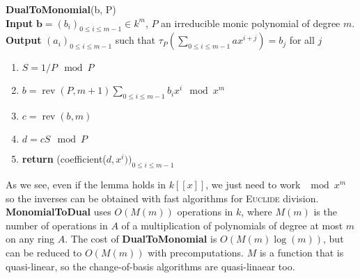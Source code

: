 \documentclass[a4paper,11pt]{article}
\theoremstyle{break}
\theoremstyle{definition}
\theoremstyle{remark}
\DeclareMathOperator{\rev}{rev}
\begin{document}
\textbf{DualToMonomial}(b, P)\\
\textbf{Input} $\textbf{b}=(b_i)_{0\leq i\leq m-1}\in k^m$, $P$ an irreducible
monic polynomial of degree $m$.\\
\textbf{Output} $(a_i)_{0\leq i \leq m-1}$ such that
$\tau_P(\sum_{0\leq i \leq m-1}ax^{i+j})=b_j$ for all $j$
\begin{enumerate}
  \item $S=1/P \mod P$
  \item $b=\rev(P,m+1)\sum_{0\leq i\leq m-1}b_ix^i\mod x^m$
  \item $c=\rev(b,m)$
  \item $d=cS \mod P$
  \item \textbf{return} (coefficient($d,x^i))_{0\leq i \leq m-1}$
\end{enumerate}

As we see, even if the lemma holds in $k[[x]]$, we just need to work $\mod x^m$
so the inverses can be obtained with fast algorithms for \textsc{Euclide}
division. \textbf{MonomialToDual} uses $O(M(m))$ operations in $k$, where 
$M(m)$ is the number of operations in $A$ of a multiplication of polynomials of 
degree at most $m$ on any ring $A$. The cost of \textbf{DualToMonomial} is 
$O(M(m)\log(m))$, but can be reduced to $O(M(m))$ with precomputations. $M$ is 
a function that is quasi-linear, so the change-of-basis algorithms are 
quasi-linaear too. 
\end{document}
